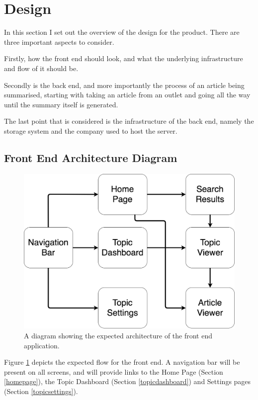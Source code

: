 \documentclass[12pt]{article}
\begin{document}
\newpage

\section{Design}

In this section I set out the overview of the design for the product. There are three important aspects to consider. 

Firstly, how the front end should look, and what the underlying infrastructure and flow of it should be. 

Secondly is the back end, and more importantly the process of an article being summarised, starting with taking an article from an outlet and going all the way until the summary itself is generated. 

The last point that is considered is the infrastructure of the back end, namely the storage system and the company used to host the server. 

\subsection{Front End Architecture Diagram}

\begin{figure}[H]
  \centering
    \includegraphics[scale=0.4]{FrontEndArchitecture.png}
   \caption[A basic diagram of the expected architecture of the front end]{A diagram showing the expected architecture of the front end application.}
   \label{frontEndArchitecture}
\end{figure}

Figure \ref{frontEndArchitecture} depicts the expected flow for the front end. A navigation bar will be present on all screens, and will provide links to the Home Page (Section \ref{homepage}), the Topic Dashboard (Section \ref{topicdashboard}) and Settings pages (Section \ref{topicsettings}). 
\end{document}
